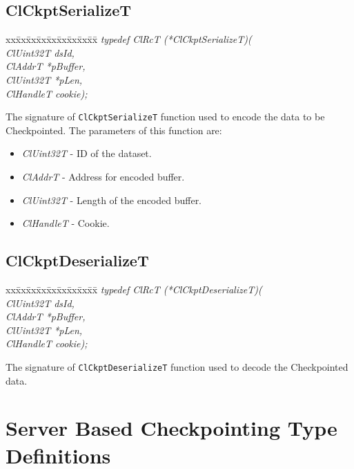 \begin{flushleft}
\subsection{ClCkptSerializeT}
\begin{tabbing}
xx\=xx\=xx\=xx\=xx\=xx\=xx\=xx\=xx\=\kill
\textit{typedef ClRcT (*ClCkptSerializeT)(}\\
\>\>\>\>\textit{ClUint32T dsId,}\\
\>\>\>\>\textit{ClAddrT *pBuffer,}\\
\>\>\>\>\textit{ClUint32T *pLen,}\\
\>\>\>\>\textit{ClHandleT cookie);}\\
\end{tabbing}
The signature of {\tt{ClCkptSerializeT}} function used to encode the data to be Checkpointed.
The parameters of this function are:
\begin{itemize}
\item
\textit{ClUint32T} - ID of the dataset.
\item
\textit{ClAddrT} - Address for encoded buffer.
\item
\textit{ClUint32T} - Length of the encoded buffer.
\item
\textit{ClHandleT} - Cookie.
\end{itemize}



\subsection{ClCkptDeserializeT}
\begin{tabbing}
xx\=xx\=xx\=xx\=xx\=xx\=xx\=xx\=xx\=\kill
\textit{typedef ClRcT (*ClCkptDeserializeT)(}\\
\>\>\>\>\textit{ClUint32T dsId,}\\
\>\>\>\>\textit{ClAddrT *pBuffer,}\\
\>\>\>\>\textit{ClUint32T *pLen,}\\
\>\>\>\>\textit{ClHandleT cookie);}\\
\end{tabbing}
The signature of {\tt{ClCkptDeserializeT}} function used to decode the Checkpointed data.                                                                                        



\section{Server Based Checkpointing Type Definitions}


\end{flushleft}
